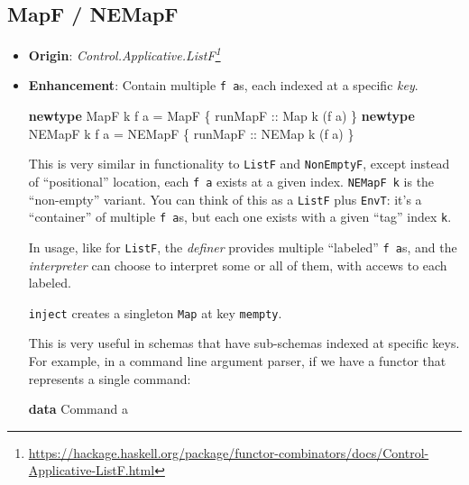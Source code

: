 \documentclass[]{article}
\newenvironment{Shaded}{}{}
\newcommand{\DataTypeTok}[1]{\textcolor[rgb]{0.56,0.13,0.00}{#1}}
\newcommand{\KeywordTok}[1]{\textcolor[rgb]{0.00,0.44,0.13}{\textbf{#1}}}
\newcommand{\NormalTok}[1]{#1}
\newcommand{\OtherTok}[1]{\textcolor[rgb]{0.00,0.44,0.13}{#1}}
\renewcommand{\href}[2]{#2\footnote{\url{#1}}}
\begin{document}
\hypertarget{mapf-nemapf}{%
\subsection{MapF / NEMapF}\label{mapf-nemapf}}

\begin{itemize}
\item
  \textbf{Origin}:
  \emph{\href{https://hackage.haskell.org/package/functor-combinators/docs/Control-Applicative-ListF.html}{Control.Applicative.ListF}}
\item
  \textbf{Enhancement}: Contain multiple \texttt{f\ a}s, each indexed at a
  specific \emph{key}.

\begin{Shaded}
\begin{Highlighting}[]
\KeywordTok{newtype} \DataTypeTok{MapF}\NormalTok{   k f a }\OtherTok{=} \DataTypeTok{MapF}\NormalTok{   \{}\OtherTok{ runMapF ::} \DataTypeTok{Map}\NormalTok{   k (f a) \}}
\KeywordTok{newtype} \DataTypeTok{NEMapF}\NormalTok{ k f a }\OtherTok{=} \DataTypeTok{NEMapF}\NormalTok{ \{}\OtherTok{ runMapF ::} \DataTypeTok{NEMap}\NormalTok{ k (f a) \}}
\end{Highlighting}
\end{Shaded}

  This is very similar in functionality to \texttt{ListF} and
  \texttt{NonEmptyF}, except instead of ``positional'' location, each
  \texttt{f\ a} exists at a given index. \texttt{NEMapF\ k} is the ``non-empty''
  variant. You can think of this as a \texttt{ListF} plus \texttt{EnvT}: it's a
  ``container'' of multiple \texttt{f\ a}s, but each one exists with a given
  ``tag'' index \texttt{k}.

  In usage, like for \texttt{ListF}, the \emph{definer} provides multiple
  ``labeled'' \texttt{f\ a}s, and the \emph{interpreter} can choose to interpret
  some or all of them, with accews to each labeled.

  \texttt{inject} creates a singleton \texttt{Map} at key \texttt{mempty}.

  This is very useful in schemas that have sub-schemas indexed at specific keys.
  For example, in a command line argument parser, if we have a functor that
  represents a single command:

\begin{Shaded}
\begin{Highlighting}[]
\KeywordTok{data} \DataTypeTok{Command}\NormalTok{ a}
\end{Highlighting}
\end{Shaded}


\end{itemize}
\end{document}

